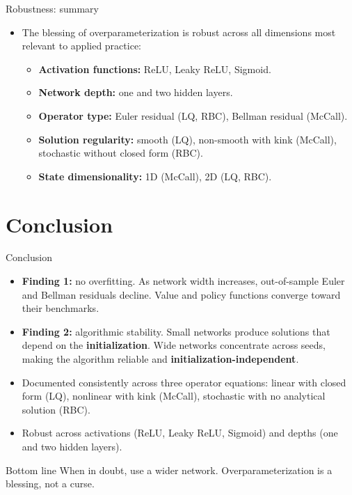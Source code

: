 \documentclass[aspectratio=169,10pt]{beamer}
\newcommand{\emphcolor}[1]{\textbf{\textcolor{emphcolorval}{#1}}}
\begin{document}
\begin{frame}{Robustness: summary}
	\vspace{0.1in}
	\begin{itemize}
		\item The blessing of overparameterization is robust across all dimensions most relevant to applied practice:
		\begin{itemize}
			\item \emphcolor{Activation functions:} ReLU, Leaky ReLU, Sigmoid.
			\item \emphcolor{Network depth:} one and two hidden layers.
			\item \emphcolor{Operator type:} Euler residual (LQ, RBC), Bellman residual (McCall).
			\item \emphcolor{Solution regularity:} smooth (LQ), non-smooth with kink (McCall), stochastic without closed form (RBC).
			\item \emphcolor{State dimensionality:} 1D (McCall), 2D (LQ, RBC).
		\end{itemize}
	\end{itemize}
\end{frame}

\section{\textcolor{KahouBlack}{Conclusion}}

\begin{frame}{Conclusion}
	\begin{itemize}
		\item \emphcolor{Finding 1:} no overfitting. As network width increases, out-of-sample Euler and Bellman residuals decline. Value and policy functions converge toward their benchmarks.
		\item \emphcolor{Finding 2:} algorithmic stability. Small networks produce solutions that depend on the \emphcolor{initialization}. Wide networks concentrate across seeds, making the algorithm reliable and \emphcolor{initialization-independent}.
		\item Documented consistently across three operator equations: linear with closed form (LQ), nonlinear with kink (McCall), stochastic with no analytical solution (RBC).
		\item Robust across activations (ReLU, Leaky ReLU, Sigmoid) and depths (one and two hidden layers).
	\end{itemize}
	\begin{block}{Bottom line}
		When in doubt, use a wider network. Overparameterization is a blessing, not a curse.
	\end{block}
\end{frame}
\end{document}
